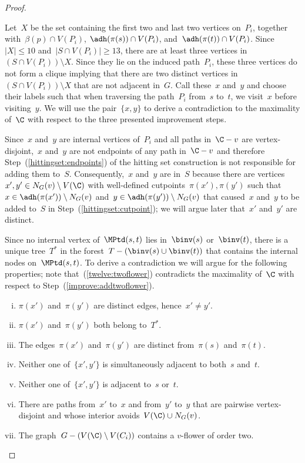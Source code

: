 \begin{proof}
\begin{claimproof}
Let~$X$ be the set containing the first two and last two vertices on~$P_i$, together with~$\beta(p) \cap V(P_i)$, $\adh(\pi(s)) \cap V(P_i)$, and~$\adh(\pi(t)) \cap V(P_i)$. Since~$|X| \leq 10$ and~$|S \cap V(P_i)| \geq 13$, there are at least three vertices in~$(S \cap V(P_i)) \setminus X$. Since they lie on the induced path~$P_i$, these three vertices do not form a clique implying that there are two distinct vertices in~$(S \cap V(P_i)) \setminus X$ that are not adjacent in~$G$. Call these~$x$ and~$y$ and choose their labels such that when traversing the path~$P_i$ from~$s$ to~$t$, we visit~$x$ before visiting~$y$. We will use the pair~$\{x,y\}$ to derive a contradiction to the maximality of~$\C$ with respect to the three presented improvement steps.

Since~$x$ and~$y$ are internal vertices of~$P_i$ and all paths in~$\C - v$ are vertex-disjoint,~$x$ and~$y$ are not endpoints of any path in~$\C - v$ and therefore Step~(\ref{hittingset:endpoints}) of the hitting set construction is not responsible for adding them to~$S$. Consequently,~$x$ and~$y$ are in~$S$ because there are vertices~$x',y' \in N_G(v) \setminus V(\C)$ with well-defined cutpoints~$\pi(x'), \pi(y')$ such that~$x \in \adh(\pi(x')) \setminus N_G(v)$ and~$y \in \adh(\pi(y')) \setminus N_G(v)$ that caused~$x$ and~$y$ to be added to~$S$ in Step~(\ref{hittingset:cutpoint}); we will argue later that~$x'$ and~$y'$ are distinct.

Since no internal vertex of~$\MPtd(s,t)$ lies in~$\binv(s)$ or~$\binv(t)$, there is a unique tree~$T^*$ in the forest~$T - (\binv(s) \cup \binv(t))$ that contains the internal nodes on~$\MPtd(s,t)$. To derive a contradiction we will argue for the following properties; note that~(\ref{twelve:twoflower}) contradicts the maximality of~$\C$ with respect to Step~(\ref{improve:addtwoflower}).

\begin{enumerate}[(i)]
	\item $\pi(x')$ and~$\pi(y')$ are distinct edges, hence~$x' \neq y'$.\label{twelve:xy:distinct:cutpoint}
	\item $\pi(x')$ and~$\pi(y')$ both belong to~$T^*$.\label{twelve:xy:cutpoints:in:subtree}
	\item The edges~$\pi(x')$ and~$\pi(y')$ are distinct from~$\pi(s)$ and~$\pi(t)$.\label{twelve:primetost:distinct:cutpoint}
	\item Neither one of~$\{x',y'\}$ is simultaneously adjacent to both~$s$ and~$t$.\label{twelve:prime:not:both:st}
	\item Neither one of~$\{x',y'\}$ is adjacent to~$s$ or~$t$.\label{twelve:prime:not:one:st}
	\item There are paths from~$x'$ to~$x$ and from~$y'$ to~$y$ that are pairwise vertex-disjoint and whose interior avoids~$V(\C) \cup N_G(v)$.\label{twelve:twopaths}
	\item The graph~$G - (V(\C) \setminus V(C_i))$ contains a $v$-flower of order two.\label{twelve:twoflower}
\end{enumerate}


\end{claimproof}
\end{proof}
